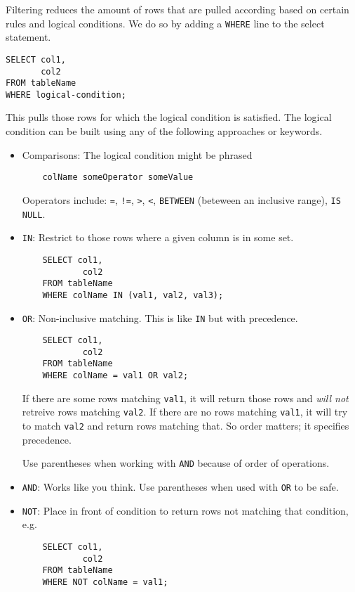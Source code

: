 \documentclass[12pt]{article}
\theoremstyle{plain}
\theoremstyle{definition}
\theoremstyle{remark}
\begin{document}
Filtering reduces the amount of rows that are pulled according based
on certain rules and logical conditions.
We do so by adding a \texttt{WHERE} line to the select statement.
\begin{lstlisting}
SELECT col1,
       col2
FROM tableName
WHERE logical-condition;
\end{lstlisting}
This pulls those rows for which the logical condition is satisfied.
The logical condition can be built using any of the following
approaches or keywords.
\begin{itemize}
  \item Comparisons:
    The logical condition might be phrased
    \begin{lstlisting}
    colName someOperator someValue
    \end{lstlisting}
    Ooperators include:
    \texttt{=},
    \texttt{!=},
    \texttt{>},
    \texttt{<},
    \texttt{BETWEEN} (beteween an inclusive range),
    \texttt{IS NULL}.

  \item \texttt{IN}:
    Restrict to those rows where a given column is in some set.
    \begin{lstlisting}
    SELECT col1,
            col2
    FROM tableName
    WHERE colName IN (val1, val2, val3);
    \end{lstlisting}

  \item \texttt{OR}:
    Non-inclusive matching.
    This is like \texttt{IN} but with precedence.
    \begin{lstlisting}
    SELECT col1,
            col2
    FROM tableName
    WHERE colName = val1 OR val2;
    \end{lstlisting}
    If there are some rows matching \texttt{val1}, it will return
    those rows and \emph{will not} retreive rows matching
    \texttt{val2}.
    If there are no rows matching \texttt{val1}, it will try to
    match \texttt{val2} and return rows matching that.
    So order matters; it specifies precedence.

    Use parentheses when working with \texttt{AND} because of order
    of operations.

  \item \texttt{AND}:
    Works like you think.
    Use parentheses when used with \texttt{OR} to be safe.

  \item \texttt{NOT}:
    Place in front of condition to return rows not matching that
    condition, e.g.
    \begin{lstlisting}
    SELECT col1,
            col2
    FROM tableName
    WHERE NOT colName = val1;
    \end{lstlisting}


\end{itemize}
\end{document}
